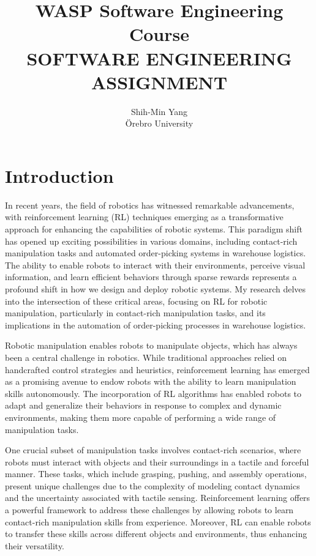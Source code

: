 \documentclass[11pt]{article}
\title{WASP Software Engineering Course\\SOFTWARE ENGINEERING ASSIGNMENT}
\author{\Large Shih-Min Yang\\ \Large Örebro University}
\date{}
\begin{document}
\maketitle


\section*{Introduction}
In recent years, the field of robotics has witnessed remarkable advancements, with reinforcement learning (RL) techniques emerging as a transformative approach for enhancing the capabilities of robotic systems. This paradigm shift has opened up exciting possibilities in various domains, including contact-rich manipulation tasks and automated order-picking systems in warehouse logistics. The ability to enable robots to interact with their environments, perceive visual information, and learn efficient behaviors through sparse rewards represents a profound shift in how we design and deploy robotic systems. My research delves into the intersection of these critical areas, focusing on RL for robotic manipulation, particularly in contact-rich manipulation tasks, and its implications in the automation of order-picking processes in warehouse logistics.

Robotic manipulation enables robots to manipulate objects, which has always been a central challenge in robotics. While traditional approaches relied on handcrafted control strategies and heuristics, reinforcement learning has emerged as a promising avenue to endow robots with the ability to learn manipulation skills autonomously. The incorporation of RL algorithms has enabled robots to adapt and generalize their behaviors in response to complex and dynamic environments, making them more capable of performing a wide range of manipulation tasks.

One crucial subset of manipulation tasks involves contact-rich scenarios, where robots must interact with objects and their surroundings in a tactile and forceful manner. These tasks, which include grasping, pushing, and assembly operations, present unique challenges due to the complexity of modeling contact dynamics and the uncertainty associated with tactile sensing. Reinforcement learning offers a powerful framework to address these challenges by allowing robots to learn contact-rich manipulation skills from experience. Moreover, RL can enable robots to transfer these skills across different objects and environments, thus enhancing their versatility.
\end{document}
